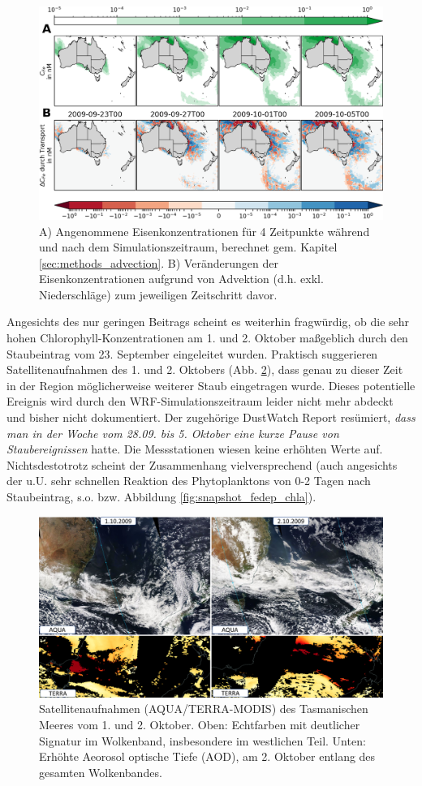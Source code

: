 \documentclass[12pt,a4paper,onecolumn,headheight=30pt]{scrartcl}
\begin{document}
\begin{figure}[htbp]
\includegraphics[width=\textwidth]{bilder/iron_transport.png}
\caption{A) Angenommene Eisenkonzentrationen für 4 Zeitpunkte während und nach dem Simulationszeitraum, berechnet gem. Kapitel \ref{sec:methods_advection}. B) Veränderungen der Eisenkonzentrationen aufgrund von Advektion (d.h. exkl. Niederschläge) zum jeweiligen Zeitschritt davor.} \label{fig:iron_transport}
\end{figure}
Angesichts des nur geringen Beitrags scheint es weiterhin fragwürdig, ob die sehr hohen Chlorophyll-Konzentrationen am 1. und 2. Oktober maßgeblich durch den Staubeintrag vom 23. September eingeleitet wurden. Praktisch suggerieren Satellitenaufnahmen des 1. und 2. Oktobers (Abb. \ref{fig:satellite_october}), dass genau zu dieser Zeit in der Region möglicherweise weiterer Staub eingetragen wurde. Dieses potentielle Ereignis wird durch den WRF-Simulationszeitraum leider nicht mehr abdeckt und bisher nicht dokumentiert. Der zugehörige DustWatch Report \citep{Leys.2009b} resümiert, \textit{dass man in der Woche vom 28.09. bis 5. Oktober eine kurze Pause von Staubereignissen} hatte. Die Messstationen wiesen keine erhöhten Werte auf. Nichtsdestotrotz scheint der Zusammenhang vielversprechend (auch angesichts der u.U. sehr schnellen Reaktion des Phytoplanktons von 0-2 Tagen nach Staubeintrag, s.o. bzw. Abbildung \ref{fig:snapshot_fedep_chla}).
\begin{figure}[htbp]
\includegraphics[width=\textwidth]{bilder/satellite_october.png}
\caption{Satellitenaufnahmen (AQUA/TERRA-MODIS) des Tasmanischen Meeres vom 1. und 2. Oktober. Oben: Echtfarben mit deutlicher Signatur im Wolkenband, insbesondere im westlichen Teil. Unten: Erhöhte Aeorosol optische Tiefe (AOD), am 2. Oktober entlang des gesamten Wolkenbandes.} \label{fig:satellite_october}
\end{figure}
\end{document}
